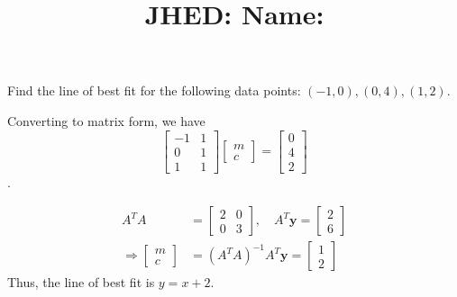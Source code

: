 \documentclass[reqno, answers]{exam}
\title{\normalsize{
  JHED: \underline{\hspace{4cm}} \hspace{1em} Name: \underline{\hspace{9cm}}}
   }
\author{}
\date{}
\begin{document}
\maketitle
\vspace{-2cm} %

\begin{questions}

\question 
Find the line of best fit for the following data points: $(-1, 0), (0, 4), (1, 2)$.
\begin{solution}
Converting to matrix form, we have
\[\begin{bmatrix}
-1 & 1 \\
0 & 1 \\
1 & 1
\end{bmatrix}
\begin{bmatrix}m \\ c
\end{bmatrix} =
\begin{bmatrix}0 \\ 4 \\ 2
\end{bmatrix}\].

\begin{align*}
  A^T A &= \begin{bmatrix}2 & 0 \\ 0 & 3
\end{bmatrix}, \quad
A^T \mathbf{y} = \begin{bmatrix}2 \\ 6
\end{bmatrix} \\
\Rightarrow \begin{bmatrix}m \\ c
\end{bmatrix} &= (A^T A)^{-1} A^T \mathbf{y} = \begin{bmatrix}1 \\ 2  \end{bmatrix}
\end{align*}
Thus, the line of best fit is $y = x + 2$.
\end{solution}

\newpage
\question
{}
\end{questions}
\end{document}
